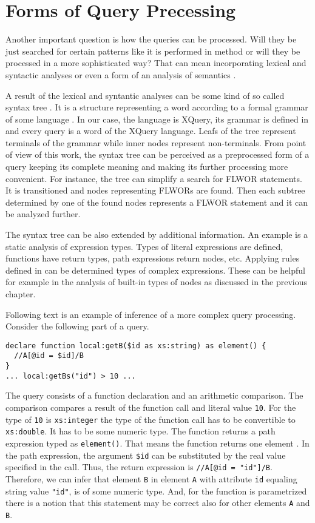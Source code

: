 \section{Forms of Query Precessing}
Another important question is how the queries can be processed. Will they be just searched for certain patterns like it is performed in method \cite{Necasky:2009:DXK:1529282.1529414} or will they be processed in a more sophisticated way? That can mean incorporating lexical and syntactic analyses  or even a form of an analysis of semantics .

A result of the lexical and syntantic analyses can be some kind of so called syntax tree . It is a structure representing a word according to a formal grammar of some language . In our case, the language is XQuery, its grammar is defined in  and every query is a word of the XQuery language. Leafs of the tree represent terminals of the grammar while inner nodes represent non-terminals.  From point of view of this work, the syntax tree can be perceived as a preprocessed form of a query keeping its complete meaning and making its further processing more convenient. For instance, the tree can simplify a search for FLWOR statements. It is transitioned and nodes representing FLWORs are found. Then each subtree determined by one of the found nodes represents a FLWOR statement and it can be analyzed further.

The syntax tree can be also extended by additional information. An example is a static analysis of expression types. Types of literal expressions are defined, functions have return types, path expressions return nodes, etc. Applying rules defined in  can be determined types of complex expressions. These can be helpful for example in the analysis of built-in types of nodes as discussed in the previous chapter. 

Following text is an example of inference of a more complex query processing. Consider the following part of a query.
\begin{verbatim}
declare function local:getB($id as xs:string) as element() {
  //A[@id = $id]/B
}
... local:getBs("id") > 10 ...
\end{verbatim}
The query consists of a function declaration and an arithmetic comparison. The comparison compares a result of the function call and literal value \texttt{10}. For the type of \texttt{10} is \texttt{xs:integer} the type of the function call has to be convertible to \texttt{xs:double}. It has to be some numeric type. The function returns a path expression typed as \texttt{element()}. That means the function returns one element . In the path expression, the argument \texttt{\$id} can be substituted by the real value specified in the call. Thus, the return expression is \texttt{//A[@id = "id"]/B}. Therefore, we can infer that element \texttt{B} in element \texttt{A} with attribute \texttt{id} equaling string value \texttt{"id"}, is of some numeric type. And, for the function is parametrized there is a notion that this statement may be correct also for other elements \texttt{A} and \texttt{B}.

